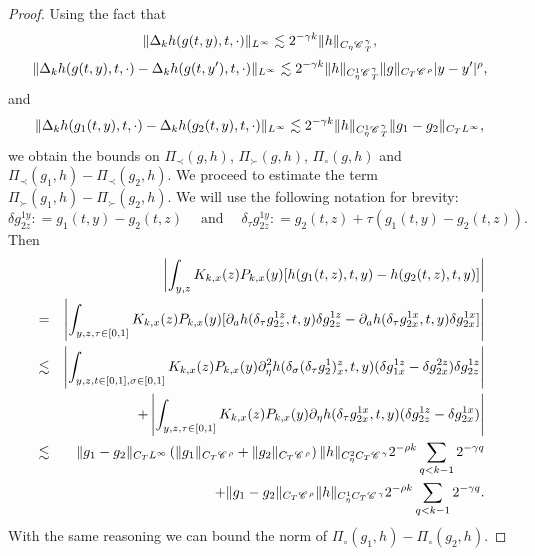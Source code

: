 \documentclass[11pt,reqno]{amsart}
\newcommand{\tmop}[1]{\ensuremath{\operatorname{#1}}}
\newcommand{\CC}{\mathscr{C} \hspace{.1em}}
\begin{document}
\begin{proof}
  Using the fact that
  \[ \| \Delta_k h (g (t, y), t, \cdot) \|_{L^{\infty}} \lesssim 2^{- \gamma
     k} \| h \|_{C_{\eta} \CC_T^{\gamma}}, \]
  \[ \| \Delta_k h (g (t, y), t, \cdot) - \Delta_k h (g (t, y'), t, \cdot)
     \|_{L^{\infty}} \lesssim 2^{- \gamma k} \| h \|_{C_{\eta}^1
     \CC_T^{\gamma}} \| g \|_{C_T  \CC^{\rho}} | y - y' |^{\rho}, \]
  and
  \[ \| \Delta_k h (g_1 (t, y), t, \cdot) - \Delta_k h (g_2 (t, y), t, \cdot)
     \|_{L^{\infty}} \lesssim 2^{- \gamma k} \| h \|_{C_{\eta}^1
     \CC_T^{\gamma}} \| g_1 - g_2 \|_{C_T L^{\infty}}, \]
  we obtain the bounds on $\Pi_{\prec} (g, h)$, $\Pi_{\succ} (g, h)$,
  $\Pi_{\circ} (g, h)$ and $\Pi_{\prec} (g_1, h) - \Pi_{\prec} (g_2, h)$. We
  proceed to estimate the term $\Pi_{\succ} (g_1, h) - \Pi_{\succ} (g_2, h)$.
  We will use the following notation for brevity:
  \[ \delta g_{2 z}^{1 y} : = g_1 (t, y) - g_2 (t, z) \quad \tmop{and} \quad
     \delta_{\tau} g_{2 z}^{1 y} : = g_2 (t, z) + \tau (g_1  (t, y) - g_2 (t,
     z)) . \]
  Then
  \begin{eqnarray*}
    &  & \left| \int_{y, z} K_{k, x} (z) P_{k, x} (y) [h (g_1 (t, z), t, y) -
    h (g_2 (t, z), t, y)] \right|\\
    & = & \left| \int_{y, z, \tau \in [0, 1]} K_{k, x} (z) P_{k, x} (y)
    [\partial_a h (\delta_{\tau} g_{2 z}^{1 z}, t, y) \delta g_{2 z}^{1 z} -
    \partial_a h (\delta_{\tau} g_{2 x}^{1 x}, t, y) \delta g_{2 x}^{1 x}]
    \right|\\
    & \lesssim & \left| \int_{y, z, t \in [0, 1], \sigma \in [0, 1]} K_{k, x}
    (z) P_{k, x} (y) \partial^2_{\eta} h (\delta_{\sigma} (\delta_{\tau}
    g_2^1)^z_x, t, y) (\delta g^{1 z}_{1 x} - \delta g^{2 z}_{2 x}) \delta
    g_{2 z}^{1 z} \right|\\
    &  & + \left| \int_{y, z, \tau \in [0, 1]} K_{k, x} (z) P_{k, x} (y)
    \partial_{\eta} h (\delta_{\tau} g_{2 x}^{1 x}, t, y) (\delta g_{2 z}^{1
    z} - \delta g_{2 x}^{1 x}) \right|\\
    & \lesssim & \| g_1 - g_2 \|_{C_T L^{\infty}} \left( \| g_1 \|_{C_T
    \CC^{\rho}} + \| g_2 \|_{C_T \CC^{\rho}} \right) \| h \|_{C_{\eta}^2 C_T
    \CC^{\gamma}} 2^{- \rho k} \sum_{q < k - 1} 2^{- \gamma q}\\
    &  & + \| g_1 - g_2 \|_{C_T \CC^{\rho}}  \| h \|_{C_{\eta}^1 C_T
    \CC^{\gamma}} 2^{- \rho k} \sum_{q < k - 1} 2^{- \gamma q} .
  \end{eqnarray*}
  With the same reasoning we can bound the norm of $\Pi_{\circ} (g_1, h) -
  \Pi_{\circ} (g_2, h)$.
\end{proof}
\end{document}
